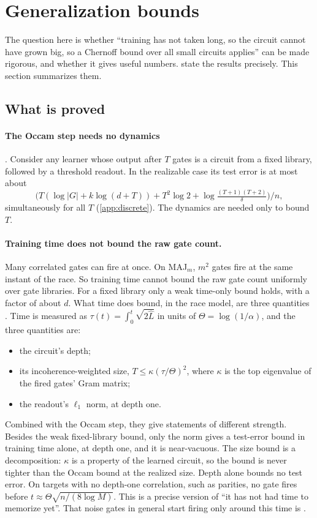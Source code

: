 \section{Generalization bounds}\label{sec:bounds}

The question here is whether ``training has not taken long, so the circuit cannot have grown big, so a Chernoff bound over all small circuits applies'' can be made rigorous, and whether it gives useful numbers.  state the results precisely. This section summarizes them.

\subsection{What is proved}

\paragraph{The Occam step needs no dynamics} . Consider any learner whose output after $T$ gates is a circuit from a fixed library, followed by a threshold readout. In the realizable case its test error is at most about
\[
\bigl(T(\log|G|+k\log(d+T))+T^2\log2+\log\tfrac{(T+1)(T+2)}{\delta}\bigr)/n,
\]
simultaneously for all $T$ (\cref{app:discrete}). The dynamics are needed only to bound $T$.

\paragraph{Training time does not bound the raw gate count.} Many correlated gates can fire at once. On MAJ$_m$, $m^2$ gates fire at the same instant of the race. So training time cannot bound the raw gate count uniformly over gate libraries. For a fixed library only a weak time-only bound holds, with a factor of about $d$. What time does bound, in the race model, are three quantities . Time is measured as $\tau(t)=\int_0^t\sqrt{2\hat L}$ in units of $\Theta=\log(1/\alpha)$, and the three quantities are:
\begin{itemize}
\item the circuit's depth;
\item its incoherence-weighted size, $T\le\kappa(\tau/\Theta)^2$, where $\kappa$ is the top eigenvalue of the fired gates' Gram matrix;
\item the readout's $\ell_1$ norm, at depth one.
\end{itemize}
Combined with the Occam step, they give statements of different strength. Besides the weak fixed-library bound, only the norm gives a test-error bound in training time alone, at depth one, and it is near-vacuous. The size bound is a decomposition: $\kappa$ is a property of the learned circuit, so the bound is never tighter than the Occam bound at the realized size. Depth alone bounds no test error. On targets with no depth-one correlation, such as parities, no gate fires before $t\approx\Theta\sqrt{n/(8\log M)}$. This is a precise version of ``it has not had time to memorize yet''. That noise gates in general start firing only around this time is .

